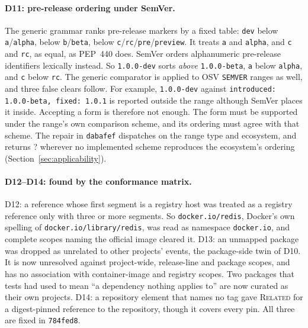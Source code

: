 \documentclass[11pt,a4paper]{article}
\newcommand{\code}[1]{\texttt{#1}}
\newcommand{\Ind}{\textsf{?}}
\newcommand{\delevencommit}{\code{dabafef}}
\newcommand{\dtwelvecommit}{\code{784fed8}}
\begin{document}
\paragraph{D11: pre-release ordering under SemVer.} The generic
grammar ranks pre-release markers by a fixed table: \code{dev} below
\code{a}/\code{alpha}, below \code{b}/\code{beta}, below
\code{c}/\code{rc}/\code{pre}/\code{preview}. It treats \code{a} and
\code{alpha}, and \code{c} and \code{rc}, as equal, as PEP~440 does.
SemVer orders alphanumeric pre-release identifiers lexically instead.
So \code{1.0.0-dev} sorts \emph{above} \code{1.0.0-beta}, \code{a}
below \code{alpha}, and \code{c} below \code{rc}. The generic comparator
is applied to OSV \code{SEMVER} ranges as well, and three false clears
follow. For example, \code{1.0.0-dev} against \code{introduced:
1.0.0-beta, fixed: 1.0.1} is reported outside the range although
SemVer places it inside. Accepting a form is therefore not enough. The
form must be supported under the range's own comparison scheme, and
its ordering must agree with that scheme. The repair in
\delevencommit{} dispatches on the range type and ecosystem, and
returns \Ind{} wherever no implemented scheme reproduces the
ecosystem's ordering (Section~\ref{sec:applicability}).

\paragraph{D12--D14: found by the conformance matrix.} D12: a reference
whose first segment is a registry host was treated as a registry
reference only with three or more segments. So \code{docker.io/redis},
Docker's own spelling of \code{docker.io/library/redis}, was read as
namespace \code{docker.io}, and complete scopes naming the official
image cleared it. D13: an unmapped package was dropped as unrelated to
other projects' events, the package-side twin of D10. It is now
unresolved against project-wide, release-line and package scopes, and
has no association with container-image and registry scopes. Two
packages that tests had used to mean ``a dependency nothing applies to''
are now curated as their own projects. D14: a repository element that
names no tag gave \textsc{Related} for a digest-pinned reference to
the repository, though it covers every pin. All three are fixed in
\dtwelvecommit{}.
\end{document}
